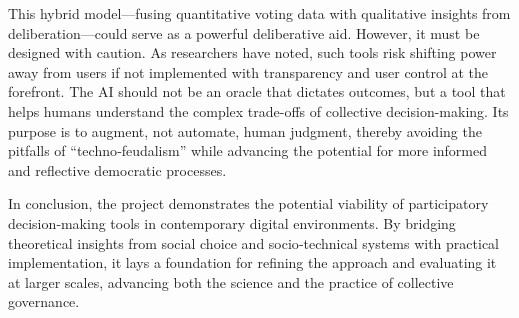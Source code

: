 This hybrid model—fusing quantitative voting data with qualitative
insights from deliberation—could serve as a powerful deliberative aid.
However, it must be designed with caution.  As researchers have noted,
such tools risk shifting power away from users if not implemented with
transparency and user control at the forefront.  The AI should not be an
oracle that dictates outcomes, but a tool that helps humans understand
the complex trade-offs of collective decision-making.  Its purpose is to
augment, not automate, human judgment, thereby avoiding the pitfalls of
``techno‑feudalism'' while advancing the potential for more informed and
reflective democratic processes.

In conclusion, the project demonstrates the potential viability of
participatory decision‑making tools in contemporary digital environments.
By bridging theoretical insights from social choice and socio‑technical
systems with practical implementation, it lays a foundation for
refining the approach and evaluating it at larger scales, advancing both
the science and the practice of collective governance.
